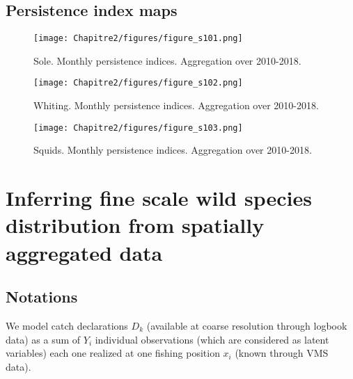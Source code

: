 \newpage

\section{Persistence index maps}\label{appendix:PersistenceIndexMaps}

\begin{figure}[H]
   \begin{center}
      \texttt{[image: Chapitre2/figures/figure\_s101.png]}
   \end{center}
   \caption[Sole. Monthly persistence indices. Aggregation over 2010-2018.]
   {Sole. Monthly persistence indices. Aggregation over 2010-2018.}
   \label{fig:Chap2FigS101}
\end{figure}

\begin{figure}[H]
   \begin{center}
      \texttt{[image: Chapitre2/figures/figure\_s102.png]}
   \end{center}
   \caption[Whiting. Monthly persistence indices. Aggregation over 2010-2018.]
   {Whiting. Monthly persistence indices. Aggregation over 2010-2018.}
   \label{fig:Chap2FigS102}
\end{figure}

\begin{figure}[H]
   \begin{center}
      \texttt{[image: Chapitre2/figures/figure\_s103.png]}
   \end{center}
   \caption[Squids. Monthly persistence indices. Aggregation over 2010-2018.]
   {Squids. Monthly persistence indices. Aggregation over 2010-2018.}
   \label{fig:Chap2FigS103}
\end{figure}

\chapter{Inferring fine scale wild species distribution from spatially aggregated data}\label{appendix:Chap3}

\section{Notations}

We model catch declarations \(D_k\) (available at coarse resolution through logbook data) as a sum of \(Y_{i}\) individual observations (which are considered as latent variables) each one realized at one fishing position \(x_{i}\) (known through VMS data).

